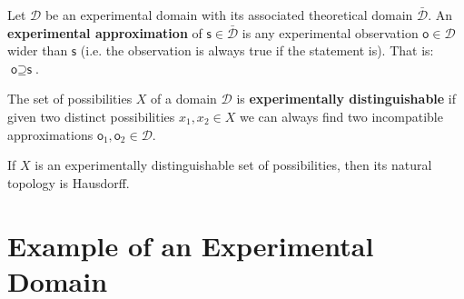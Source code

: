\documentclass[11pt,letterpaper,fleqn]{memoir} %
\begin{document}
\begin{mathSection}
	
\begin{defn}
	Let $\mathcal{D}$ be an experimental domain with its associated theoretical domain $\bar{\mathcal{D}}$. An \textbf{experimental approximation} of $\textsf{s} \in \bar{\mathcal{D}}$ is any experimental observation $\textsf{o} \in \mathcal{D}$ wider than $\textsf{s}$ (i.e. the observation is always true if the statement is). That is: $\textsf{o} \supseteq \textsf{s}$.
\end{defn}

\begin{defn}
	The set of possibilities $X$ of a domain $\mathcal{D}$ is \textbf{experimentally distinguishable} if given two distinct possibilities $x_1, x_2 \in X$ we can always find two incompatible approximations $\textsf{o}_1, \textsf{o}_2 \in \mathcal{D}$.
\end{defn}

\begin{prop}
	If $X$ is an experimentally distinguishable set of possibilities, then its natural topology is Hausdorff.
\end{prop}


	
\end{mathSection}


\section{Example of an Experimental Domain}
\end{document}
